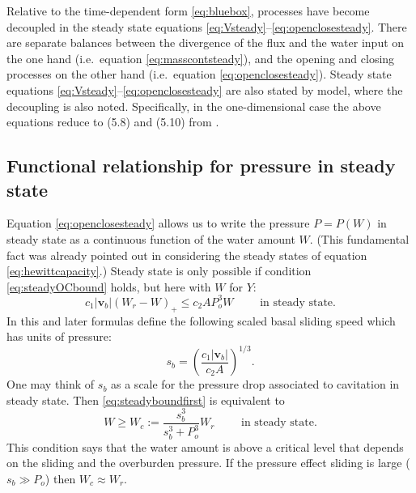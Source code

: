 \documentclass[11pt,final]{amsart}
\newcommand\bv{\mathbf{v}}
\begin{document}
Relative to the time-dependent form \eqref{eq:bluebox}, processes have become decoupled in the steady state equations \eqref{eq:Vsteady}--\eqref{eq:openclosesteady}.  There are separate balances between the divergence of the flux and the water input on the one hand (i.e.~equation \eqref{eq:masscontsteady}), and the opening and closing processes on the other hand (i.e.~equation \eqref{eq:openclosesteady}).  Steady state equations \eqref{eq:Vsteady}--\eqref{eq:openclosesteady} are also stated by \cite{Schoofetal2012} model, where the decoupling is also noted.  Specifically, in the one-dimensional case the above equations reduce to (5.8) and (5.10) from \cite{Schoofetal2012}.


\subsection*{Functional relationship for pressure in steady state}  Equation \eqref{eq:openclosesteady} allows us to write the pressure $P=P(W)$ in steady state as a continuous function of the water amount $W$.  (This fundamental fact was already pointed out in considering the steady states of equation \eqref{eq:hewittcapacity}.)  Steady state is only possible if condition \eqref{eq:steadyOCbound} holds, but here with $W$ for $Y$:
\begin{equation}
c_1 |\bv_b| (W_r - W)_+ \le c_2 A P_o^3 W \qquad \text{ in steady state}. \label{eq:steadyboundfirst}
\end{equation}
In this and later formulas define the following scaled basal sliding speed which has units of pressure:
\begin{equation}
s_b =  \left(\frac{c_1 |\bv_b|}{c_2 A}\right)^{1/3}.  \label{eq:definesb}
\end{equation}
One may think of $s_b$ as a scale for the pressure drop associated to cavitation in steady state.  Then \eqref{eq:steadyboundfirst} is equivalent to
\begin{equation}
W \ge W_c := \frac{s_b^3}{s_b^3 + P_o^3} W_r  \qquad \text{ in steady state}. \label{eq:steadyboundsecond}
\end{equation}
This condition says that the water amount is above a critical level that depends on the sliding and the overburden pressure.  If the pressure effect sliding is large ($s_b \gg P_o$) then $W_c\approx W_r$.
\end{document}
